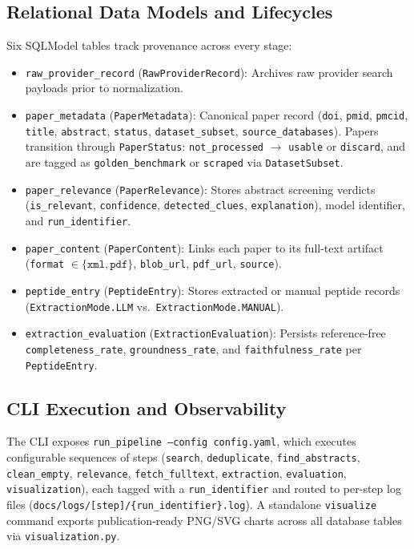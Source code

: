 \subsection{Relational Data Models and Lifecycles}
Six SQLModel tables track provenance across every stage:
\begin{itemize}
    \item \texttt{raw\_provider\_record} (\texttt{RawProviderRecord}): Archives raw provider search payloads prior to normalization.
    \item \texttt{paper\_metadata} (\texttt{PaperMetadata}): Canonical paper record (\texttt{doi}, \texttt{pmid}, \texttt{pmcid}, \texttt{title}, \texttt{abstract}, \texttt{status}, \texttt{dataset\_subset}, \texttt{source\_databases}). Papers transition through \texttt{PaperStatus}: \texttt{not\_processed} $\rightarrow$ \texttt{usable} or \texttt{discard}, and are tagged as \texttt{golden\_benchmark} or \texttt{scraped} via \texttt{DatasetSubset}.
    \item \texttt{paper\_relevance} (\texttt{PaperRelevance}): Stores abstract screening verdicts (\texttt{is\_relevant}, \texttt{confidence}, \texttt{detected\_clues}, \texttt{explanation}), model identifier, and \texttt{run\_identifier}.
    \item \texttt{paper\_content} (\texttt{PaperContent}): Links each paper to its full-text artifact (\texttt{format} $\in \{\texttt{xml}, \texttt{pdf}\}$, \texttt{blob\_url}, \texttt{pdf\_url}, \texttt{source}).
    \item \texttt{peptide\_entry} (\texttt{PeptideEntry}): Stores extracted or manual peptide records (\texttt{ExtractionMode.LLM} vs.\ \texttt{ExtractionMode.MANUAL}).
    \item \texttt{extraction\_evaluation} (\texttt{ExtractionEvaluation}): Persists reference-free \texttt{completeness\_rate}, \texttt{groundness\_rate}, and \texttt{faithfulness\_rate} per \texttt{PeptideEntry}.
\end{itemize}

\subsection{CLI Execution and Observability}
The CLI exposes \texttt{run\_pipeline --config config.yaml}, which executes configurable sequences of steps (\texttt{search}, \texttt{deduplicate}, \texttt{find\_abstracts}, \texttt{clean\_empty}, \texttt{relevance}, \texttt{fetch\_fulltext}, \texttt{extraction}, \texttt{evaluation}, \texttt{visualization}), each tagged with a \texttt{run\_identifier} and routed to per-step log files (\texttt{docs/logs/[step]/\{run\_identifier\}.log}). A standalone \texttt{visualize} command exports publication-ready PNG/SVG charts across all database tables via \texttt{visualization.py}.
